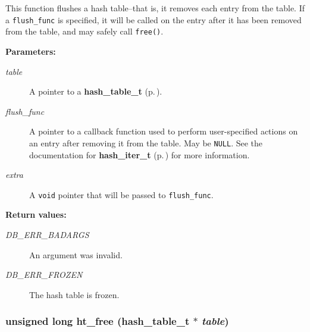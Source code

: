  This function flushes a hash table--that is, it removes each entry from the table. If a {\tt flush\_\-func} is specified, it will be called on the entry after it has been removed from the table, and may safely call {\tt free()}.\begin{Desc}
\item[{\bf Parameters: }]\par
\begin{description}
\item[
{\em table}]A pointer to a {\bf hash\_\-table\_\-t} {\rm (p.\,\pageref{group__dbprim__hash_a0})}. \item[
{\em flush\_\-func}]A pointer to a callback function used to perform user-specified actions on an entry after removing it from the table. May be {\tt NULL}. See the documentation for {\bf hash\_\-iter\_\-t} {\rm (p.\,\pageref{group__dbprim__hash_a2})} for more information. \item[
{\em extra}]A {\tt void} pointer that will be passed to {\tt flush\_\-func}.\end{description}
\end{Desc}
\begin{Desc}
\item[{\bf Return values: }]\par
\begin{description}
\item[
{\em DB\_\-ERR\_\-BADARGS}]An argument was invalid. \item[
{\em DB\_\-ERR\_\-FROZEN}]The hash table is frozen. \end{description}
\end{Desc}
\subsubsection{\setlength{\rightskip}{0pt plus 5cm}unsigned long ht\_\-free ({\bf hash\_\-table\_\-t} $\ast$ {\em table})}\label{group__dbprim__hash_a14}




